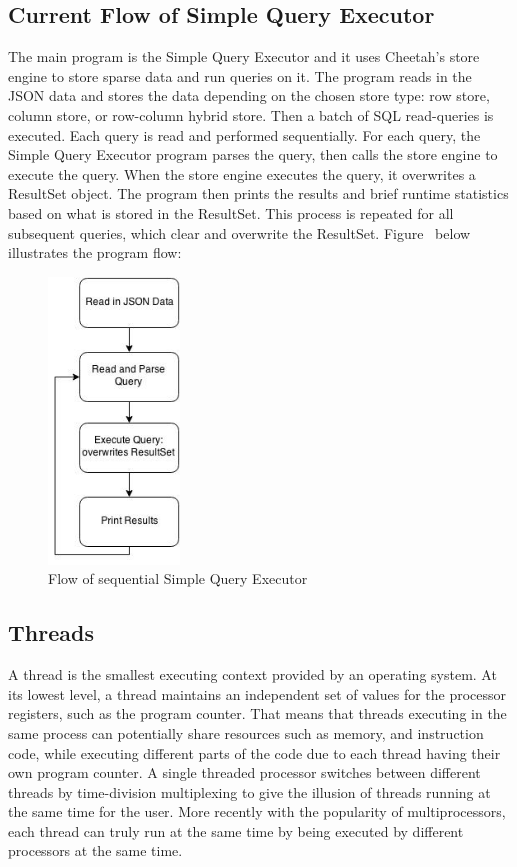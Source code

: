\documentclass[11pt,journal,compsoc]{IEEEtran}
\begin{document}
\subsection{Current Flow of Simple Query Executor}

The main program is the Simple Query Executor and it uses Cheetah’s store engine to store sparse data and run queries on it. The program reads in the JSON data and stores the data depending on the chosen store type: row store, column store, or row-column hybrid store. Then a batch of SQL read-queries is executed. Each query is read and performed sequentially. For each query, the Simple Query Executor program parses the query, then calls the store engine to execute the query. When the store engine executes the query, it overwrites a ResultSet object. The program then prints the results and brief runtime statistics based on what is stored in the ResultSet. This process is repeated for all subsequent queries, which clear and overwrite the ResultSet. Figure~\cite{fig_sequential_query} below illustrates the program flow:

\begin{figure}
\includegraphics[height=3in]{images/query_sequential}
\caption{Flow of sequential Simple Query Executor}
\label{fig_sequential_query}
\end{figure}

\subsection{Threads}
A thread is the smallest executing context provided by an operating system. At its lowest level, a thread maintains an independent set of values for the processor registers, such as the program counter. That means that threads executing in the same process can potentially share resources such as memory, and instruction code, while executing different parts of the code due to each thread having their own program counter. A single threaded processor switches between different threads by time-division multiplexing to give the illusion of threads running at the same time for the user. More recently with the popularity of multiprocessors, each thread can truly run at the same time by being executed by different processors at the same time.
\end{document}
